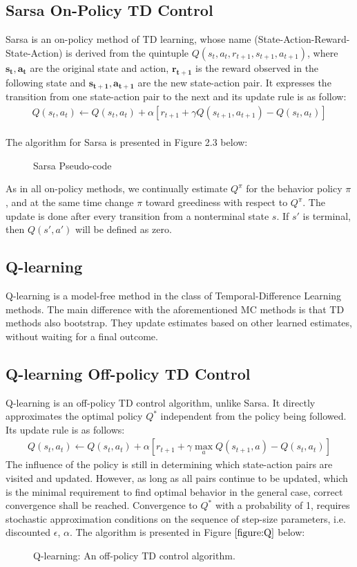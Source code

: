 \documentclass[paper=a4, fontsize=11pt]{scrartcl}
\numberwithin{equation}{section}		%
\numberwithin{figure}{section}			%
\numberwithin{table}{section}				%
\begin{document}
\subsection*{Sarsa On-Policy TD Control}
Sarsa is an on-policy method of TD learning, whose name (State-Action-Reward-State-Action) is derived from the quintuple $Q(s_t, a_t, r_{t+1}, s_{t+1}, a_{t+1})$, where  $\mathbf{s_t, a_t}$ are the original state and action, $\mathbf{r_{t+1}}$ is the reward observed in the following state and $\mathbf{s_{t+1}, a_{t+1}}$ are the new state-action pair. It expresses the transition from one state-action pair to the next and its update rule is as follow:
\begin{align}
Q(s_t, a_t) \gets Q(s_t, a_t)+\alpha[r_{t+1}+\gamma Q(s_{t+1}, a_{t+1})-Q(s_t, a_t)]
\end{align}\\
The algorithm for Sarsa is presented in Figure 2.3 below:
\begin{figure}[H] \centering
\caption{Sarsa Pseudo-code} \label{figure:Sarsa}
\end{figure}
As in all on-policy methods, we continually estimate $Q^\pi$ for the behavior policy $\pi$, and at the same time change $\pi$ toward greediness with respect to $Q^\pi$. The update is done after every transition from a nonterminal state $s$. If $s'$ is terminal, then $Q(s',a')$ will be defined as zero. \\


\subsection{\textbf {Q-learning}}
Q-learning is a model-free method in the class of Temporal-Difference Learning methods. The main difference with the aforementioned MC methods is that TD methods also bootstrap. They update estimates based on other learned estimates, without waiting for a final outcome.
\subsection*{Q-learning Off-policy TD Control}
Q-learning is an off-policy TD control algorithm, unlike Sarsa. It directly approximates the optimal policy $Q^*$ independent from the policy being followed. Its update rule is as follows:
\begin{align}
Q(s_t,a_t) \leftarrow Q(s_t,a_t)+\alpha[r_{t+1}+\gamma \max_a Q(s_{t+1},a)-Q(s_t,a_t)]
\end{align}
The influence of the policy is still in determining which state-action pairs are visited and updated. However, as long as all pairs continue to be updated, which is the minimal requirement to find optimal behavior in the general case, correct convergence shall be reached. Convergence to $Q^*$ with a probability of 1, requires stochastic approximation conditions on the sequence of step-size parameters, i.e. discounted $\epsilon$, $\alpha$. The algorithm is presented in Figure $\ref{figure:Q}$ below:
\begin{figure}[H] \centering
\caption{Q-learning: An off-policy TD control algorithm.} \label{figure:Q}
\end{figure}
\end{document}
